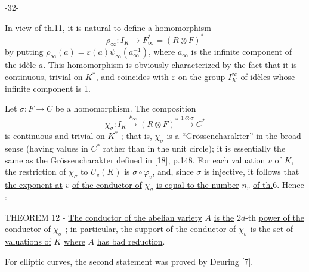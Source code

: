 -32-

In view of th.11, it is natural to define a homomorphism
\[
\rho_\infty:I_K\longrightarrow F_\infty^*=(R\otimes F)^*
\]
by putting $\rho_\infty(a)=\varepsilon(a)\psi_\infty(a_\infty^{-1})$, where $a_\infty$ is the infinite component of the idèle $a$. This homomorphism is obviously characterized by the fact that it is continuous, trivial on $K^*$, and coincides with $\varepsilon$ on the group $I_K^\infty$ of idèles whose infinite component is 1.

Let $\sigma:F\to C$ be a homomorphism. The composition
\[
\chi_\sigma:I_K\xrightarrow{\rho_\infty}(R\otimes F)^*\xrightarrow{1\otimes\sigma}C^*
\]
is continuous and trivial on $K^*$ ; that is, $\chi_\sigma$ is a ``Grössencharakter'' in the broad sense (having values in $C^*$ rather than in the unit circle); it is essentially the same as the Grössencharakter defined in [18], p.148. For each valuation $v$ of $K$, the restriction of $\chi_\sigma$ to $U_v(K)$ is $\sigma\circ\varphi_v$, and, since $\sigma$ is injective, it follows that \uline{the exponent at} $v$ \uline{of the conductor of} $\chi_\sigma$ \uline{is equal to the number} $n_v$ \uline{of th.}6. Hence :

THEOREM 12 - \uline{The conductor of the abelian variety} $A$ \uline{is the} $2d$-th \uline{power of the conductor of} $\chi_\sigma$ ; \uline{in particular}, \uline{the support of the conductor of} $\chi_\sigma$ \uline{is the set of valuations of} $K$ \uline{where} $A$ \uline{has bad reduction}.

For elliptic curves, the second statement was proved by Deuring [7].
